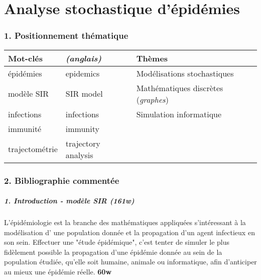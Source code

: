 \documentclass{article}
\begin{document}
\part*{Analyse stochastique d'épidémies}

\section*{1. Positionnement thématique}

\begin{tabular}{ |l | l | l| }
 Mot-clés        &  \textit{(anglais)}          &  Thèmes                              \\
\hline

 épidémies       &  epidemics            &  Modélisations stochastiques         \\

 modèle SIR      &  SIR model            &  Mathématiques discrètes (\textit{graphes}) \\

 infections      &  infections           &  Simulation informatique             \\

 immunité        &  immunity             &                                      \\

 trajectométrie  &  trajectory analysis  &                                      \\

\end{tabular}

\section*{2. Bibliographie commentée}

\subsubsection*{1. Introduction - modèle SIR (\textit{161w})}

L'épidémiologie est la branche des mathématiques appliquées s'intéressant à la modélisation d' une population donnée et la propagation d'un agent infectieux en son sein. Effectuer une "étude épidémique", c'est tenter de simuler le plus fidèlement possible la propagation d'une épidémie donnée au sein de la population étudiée, qu'elle soit humaine, animale ou informatique, afin d'anticiper au mieux une épidémie réelle. \textbf{60w}
\end{document}
